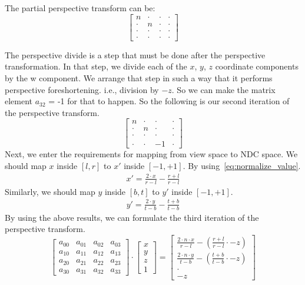 The partial perspective transform can be:
\[
\begin{bmatrix}
n & \cdot & \cdot & \cdot \\
\cdot & n & \cdot & \cdot \\
\cdot & \cdot & \cdot & \cdot \\
\cdot & \cdot & \cdot & \cdot
\end{bmatrix}
\]

The perspective divide is a step that must be done after the perspective transformation. In that step, we divide each of the $x$, $y$, $z$ coordinate components by the w component. We arrange that step in such a way that it performs perspective foreshortening. i.e., division by $-z$. So we can make the matrix element $a_{32}$ = -1 for that to happen. So the following is our second iteration of the perspective transform.
\[
\begin{bmatrix}
n & \cdot & \cdot & \cdot \\
\cdot & n & \cdot & \cdot \\
\cdot & \cdot & \cdot & \cdot \\
\cdot & \cdot & -1 & \cdot
\end{bmatrix}
\]
Next, we enter the requirements for mapping from view space to NDC space.
We should map $x$ inside $[l,r]$ to $x'$ inside $[-1, +1]$.
By using~\eqref{eq:normalize_value}.
\begin{align*}
  x' = \frac{2 \cdot x}{r-l} - \frac{r+l}{r-l}
\end{align*}
Similarly, we should map $y$ inside $[b,t]$ to $y'$ inside $[-1, +1]$.
\begin{align*}
  y' = \frac{2 \cdot y}{t-b} - \frac{t+b}{t-b}
\end{align*}
By using the above results, we can formulate the third iteration of the perspective transform.
\[
\begin{bmatrix}
a_{00} & a_{01} & a_{02} & a_{03} \\
a_{10} & a_{11} & a_{12} & a_{13} \\
a_{20} & a_{21} & a_{22} & a_{23} \\
a_{30} & a_{31} & a_{32} & a_{33}
\end{bmatrix}
\cdot
\begin{bmatrix}
x \\
y \\
z \\
1
\end{bmatrix}
=
\begin{bmatrix}
\frac{2 \cdot n \cdot x}{r-l} - (\frac{r+l}{r-l}\cdot -z)   \\
\frac{2 \cdot n \cdot y}{t-b} - (\frac{t+b}{t-b}\cdot -z)  \\
\cdot \\
-z
\end{bmatrix}
\]
